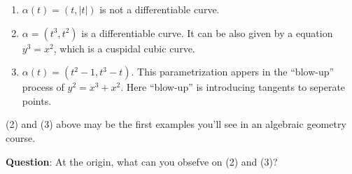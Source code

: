 \begin{exam}
    \hfill
    \begin{enumerate}[(1)]
        \item $\alpha(t)=(t,|t|)$ is not a differentiable curve.
        \begin{center}
        \end{center}
        \item $\alpha=(t^3,t^2)$ is a differentiable curve. It can be also given by a equation $y^3=x^2$, which is a cuspidal cubic curve.
        \begin{center}
        \end{center}
        \item $\alpha(t)=(t^2-1,t^3-t)$. This parametrization appers in the ``blow-up'' process of $y^2=x^3+x^2$. Here ``blow-up'' is introducing tangents to seperate points.
        \begin{center}
        \end{center}
    \end{enumerate}
\end{exam}
\begin{remark}
    (2) and (3) above may be the first examples you'll see in an algebraic geometry course.
\end{remark}
\noindent
\textbf{Question}: At the origin, what can you obsefve on (2) and (3)?

